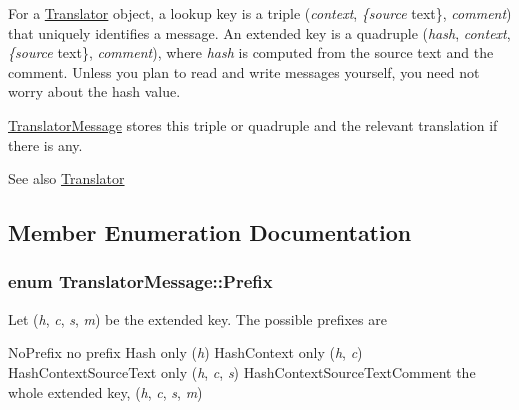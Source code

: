 For a \hyperlink{classTranslator}{Translator} object, a lookup key is a triple ({\itshape context}, {\itshape \{source} text\}, {\itshape comment}) that uniquely identifies a message. An extended key is a quadruple ({\itshape hash}, {\itshape context}, {\itshape \{source} text\}, {\itshape comment}), where {\itshape hash} is computed from the source text and the comment. Unless you plan to read and write messages yourself, you need not worry about the hash value.

\hyperlink{classTranslatorMessage}{Translator\+Message} stores this triple or quadruple and the relevant translation if there is any.

\begin{DoxySeeAlso}{See also}
\hyperlink{classTranslator}{Translator} 
\end{DoxySeeAlso}


\subsection{Member Enumeration Documentation}
\hypertarget{classTranslatorMessage_ad2e3272d30541e7634ce0050c67fc38c}{}
\subsubsection[{Prefix}]{\setlength{\rightskip}{0pt plus 5cm}enum {\bf Translator\+Message\+::\+Prefix}}\label{classTranslatorMessage_ad2e3272d30541e7634ce0050c67fc38c}
Let ({\itshape h}, {\itshape c}, {\itshape s}, {\itshape m}) be the extended key. The possible prefixes are

No\+Prefix no prefix  Hash only ({\itshape h})  Hash\+Context only ({\itshape h}, {\itshape c})  Hash\+Context\+Source\+Text only ({\itshape h}, {\itshape c}, {\itshape s})  Hash\+Context\+Source\+Text\+Comment the whole extended key, ({\itshape h}, {\itshape c}, {\itshape s}, {\itshape m})

